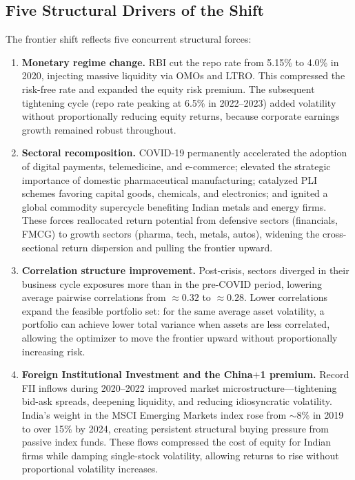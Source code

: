 \documentclass[12pt,a4paper]{article}
\begin{document}
\subsection{Five Structural Drivers of the Shift}

The frontier shift reflects five concurrent structural forces:

\begin{enumerate}
    \item \textbf{Monetary regime change.} RBI cut the repo rate from 5.15\% to 4.0\%
        in 2020, injecting massive liquidity via OMOs and LTRO. This compressed the
        risk-free rate and expanded the equity risk premium. The subsequent tightening
        cycle (repo rate peaking at 6.5\% in 2022--2023) added volatility without
        proportionally reducing equity returns, because corporate earnings growth
        remained robust throughout.

    \item \textbf{Sectoral recomposition.} COVID-19 permanently accelerated the
        adoption of digital payments, telemedicine, and e-commerce; elevated the
        strategic importance of domestic pharmaceutical manufacturing; catalyzed PLI
        schemes favoring capital goods, chemicals, and electronics; and ignited a global
        commodity supercycle benefiting Indian metals and energy firms. These forces
        reallocated return potential from defensive sectors (financials, FMCG) to growth
        sectors (pharma, tech, metals, autos), widening the cross-sectional return
        dispersion and pulling the frontier upward.

    \item \textbf{Correlation structure improvement.} Post-crisis, sectors diverged in
        their business cycle exposures more than in the pre-COVID period, lowering
        average pairwise correlations from $\approx 0.32$ to $\approx 0.28$. Lower
        correlations expand the feasible portfolio set: for the same average asset
        volatility, a portfolio can achieve lower total variance when assets are less
        correlated, allowing the optimizer to move the frontier upward without
        proportionally increasing risk.

    \item \textbf{Foreign Institutional Investment and the China$+$1 premium.}
        Record FII inflows during 2020--2022 improved market microstructure---tightening
        bid-ask spreads, deepening liquidity, and reducing idiosyncratic volatility.
        India's weight in the MSCI Emerging Markets index rose from $\sim 8\%$ in 2019
        to over 15\% by 2024, creating persistent structural buying pressure from
        passive index funds. These flows compressed the cost of equity for Indian firms
        while damping single-stock volatility, allowing returns to rise without
        proportional volatility increases.


\end{enumerate}
\end{document}
